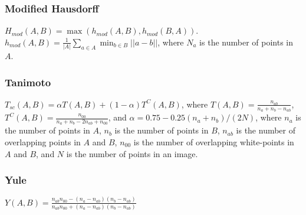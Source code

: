 \documentclass{beamer}
\begin{document}
\begin{frame}
\frametitle{Modified Hausdorff}
$H_{mod}(A, B) = \max(h_{mod}(A, B), h_{mod}(B, A))$.
$h_{mod}(A, B) = \frac{1}{|A|}\sum_{a \in A}\min_{b \in B}||a - b||$, where $N_a$ is the number of points in $A$.
\end{frame}

\begin{frame}
\frametitle{Tanimoto}
$T_{sc}(A, B) = \alpha T(A, B) + (1 - \alpha)T^C(A, B)$,
where $T(A, B) = \frac{n_{ab}}{n_a + n_b - n_{ab}}$, $T^C(A, B) = \frac{n_{00}}{n_a + n_b - 2n_{ab} + n_{00}}$, and $\alpha = 0.75 - 0.25 (n_a + n_b) / (2N)$, where $n_{a}$ is the number of points in $A$, $n_{b}$ is the number of points in $B$, $n_{ab}$ is the number of overlapping points in $A$ and $B$, $n_{00}$ is the number of overlapping white-points in $A$ and $B$, and $N$ is the number of points in an image.
\end{frame}

\begin{frame}
\frametitle{Yule}
$Y(A, B) = \frac{n_{ab} n_{00} - (n_a - n_{ab})(n_b - n_{ab})}{n_{ab} n_{00} + (n_a - n_{ab})(n_b - n_{ab})}$
\end{frame}
\end{document}
